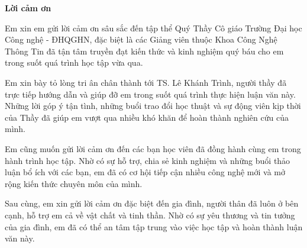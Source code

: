 \begin{center}
	\textbf{\large{Lời cảm ơn}}
\end{center}
Em xin em gửi lời cảm ơn sâu sắc đến tập thể Quý Thầy Cô giáo Trường Đại học Công nghệ - ĐHQGHN, đặc biệt là các Giảng viên thuộc Khoa Công Nghệ Thông Tin đã tận tâm truyền đạt kiến thức và kinh nghiệm quý báu cho em trong suốt quá trình học tập vừa qua.

Em xin bày tỏ lòng tri ân chân thành tới TS. Lê Khánh Trình, người thầy đã trực tiếp hướng dẫn và giúp đỡ em trong suốt quá trình thực hiện luận văn này. Những lời góp ý tận tình, những buổi trao đổi học thuật và sự động viên kịp thời của Thầy đã giúp em vượt qua nhiều khó khăn để hoàn thành nghiên cứu của mình.

Em cũng muốn gửi lời cảm ơn đến các bạn học viên đã đồng hành cùng em trong hành trình học tập. Nhờ có sự hỗ trợ, chia sẻ kinh nghiệm và những buổi thảo luận bổ ích với các bạn, em đã có cơ hội tiếp cận nhiều công nghệ mới và mở rộng kiến thức chuyên môn của mình.

Sau cùng, em xin gửi lời cảm ơn đặc biệt đến gia đình, người thân đã luôn ở bên cạnh, hỗ trợ em cả về vật chất và tinh thần. Nhờ có sự yêu thương và tin tưởng của gia đình, em đã có thể an tâm tập trung vào việc học tập và hoàn thành luận văn này.
